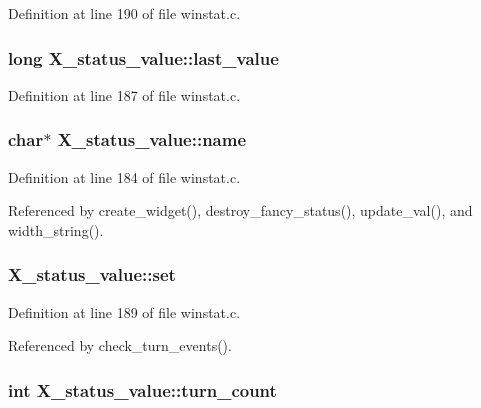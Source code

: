 Definition at line 190 of file winstat.\+c.

\hypertarget{structX__status__value_aface1691c8a57b2f7f7c59b464b3a344}{
\subsubsection[{last\+\_\+value}]{\setlength{\rightskip}{0pt plus 5cm}long X\+\_\+status\+\_\+value\+::last\+\_\+value}}\label{structX__status__value_aface1691c8a57b2f7f7c59b464b3a344}


Definition at line 187 of file winstat.\+c.

\hypertarget{structX__status__value_ad24beb14f29271c622674dc81797cdf9}{
\subsubsection[{name}]{\setlength{\rightskip}{0pt plus 5cm}char$\ast$ X\+\_\+status\+\_\+value\+::name}}\label{structX__status__value_ad24beb14f29271c622674dc81797cdf9}


Definition at line 184 of file winstat.\+c.



Referenced by create\+\_\+widget(), destroy\+\_\+fancy\+\_\+status(), update\+\_\+val(), and width\+\_\+string().

\hypertarget{structX__status__value_a08f69b079a814b7d8af52d3cf6f567ad}{
\subsubsection[{set}]{ X\+\_\+status\+\_\+value\+::set}}\label{structX__status__value_a08f69b079a814b7d8af52d3cf6f567ad}


Definition at line 189 of file winstat.\+c.



Referenced by check\+\_\+turn\+\_\+events().

\hypertarget{structX__status__value_ae9fd670e041aba9ba612cfea4adab322}{
\subsubsection[{turn\+\_\+count}]{\setlength{\rightskip}{0pt plus 5cm}int X\+\_\+status\+\_\+value\+::turn\+\_\+count}}\label{structX__status__value_ae9fd670e041aba9ba612cfea4adab322}


